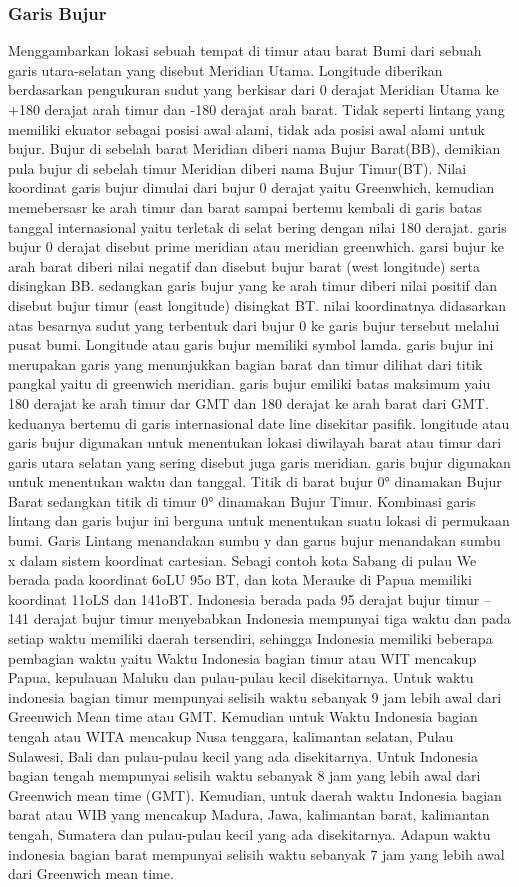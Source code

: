 \subsubsection{Garis Bujur}
Menggambarkan lokasi sebuah tempat di timur atau barat Bumi dari sebuah garis utara-selatan yang disebut Meridian Utama. Longitude diberikan berdasarkan pengukuran sudut yang berkisar dari 0 derajat Meridian Utama ke +180 derajat arah timur dan -180 derajat arah barat. Tidak seperti lintang yang memiliki ekuator sebagai posisi awal alami, tidak ada posisi awal alami untuk bujur. Bujur di sebelah barat Meridian diberi nama Bujur Barat(BB), demikian pula bujur di sebelah timur Meridian diberi nama Bujur Timur(BT).
Nilai koordinat garis bujur dimulai dari bujur 0 derajat yaitu Greenwhich, kemudian memebersasr ke arah timur dan barat sampai bertemu kembali di garis batas tanggal internasional yaitu terletak di selat bering dengan nilai 180 derajat. garis bujur 0 derajat disebut prime meridian atau meridian greenwhich. garsi bujur ke arah barat diberi nilai negatif dan disebut bujur barat (west longitude) serta disingkan BB. sedangkan garis bujur yang ke arah timur diberi nilai positif dan disebut bujur timur (east longitude) disingkat BT. nilai koordinatnya didasarkan atas besarnya sudut yang terbentuk dari bujur 0 ke garis bujur tersebut melalui pusat bumi.
Longitude atau garis bujur memiliki symbol lamda. garis bujur ini merupakan garis yang menunjukkan bagian barat dan timur dilihat dari titik pangkal yaitu di greenwich meridian. garis bujur emiliki batas maksimum yaiu 180 derajat ke arah timur dar GMT dan 180 derajat ke arah barat dari GMT. keduanya bertemu di garis internasional date line disekitar pasifik.
longitude atau garis bujur digunakan untuk menentukan lokasi diwilayah barat atau timur dari garis utara selatan yang sering disebut juga garis meridian. garis bujur digunakan untuk menentukan waktu dan tanggal.
Titik di barat bujur 0° dinamakan Bujur Barat sedangkan titik di timur 0° dinamakan Bujur Timur. Kombinasi garis lintang dan garis bujur ini berguna untuk menentukan suatu lokasi di permukaan bumi. Garis Lintang menandakan sumbu y dan garus bujur menandakan sumbu x dalam sistem koordinat cartesian. Sebagi contoh kota Sabang di pulau We berada pada koordinat 6oLU 95o BT, dan kota Merauke di Papua memiliki koordinat 11oLS dan 141oBT.
Indonesia berada pada 95 derajat bujur timur – 141 derajat bujur timur menyebabkan Indonesia mempunyai tiga waktu dan pada setiap waktu memiliki daerah tersendiri, sehingga Indonesia memiliki beberapa pembagian waktu yaitu Waktu Indonesia bagian timur atau WIT mencakup Papua, kepulauan Maluku dan pulau-pulau kecil disekitarnya. Untuk waktu indonesia bagian  timur mempunyai selisih waktu sebanyak 9 jam lebih awal dari Greenwich Mean time atau GMT. Kemudian untuk Waktu Indonesia bagian tengah atau WITA mencakup Nusa tenggara, kalimantan selatan, Pulau Sulawesi, Bali dan pulau-pulau kecil yang ada disekitarnya. Untuk Indonesia bagian tengah mempunyai selisih waktu sebanyak 8 jam yang lebih awal dari Greenwich mean time (GMT). Kemudian, untuk daerah waktu Indonesia bagian barat atau WIB yang mencakup Madura, Jawa, kalimantan barat, kalimantan tengah, Sumatera dan pulau-pulau kecil yang ada disekitarnya. Adapun waktu indonesia bagian barat mempunyai selisih waktu sebanyak 7 jam yang lebih awal dari Greenwich mean time.
